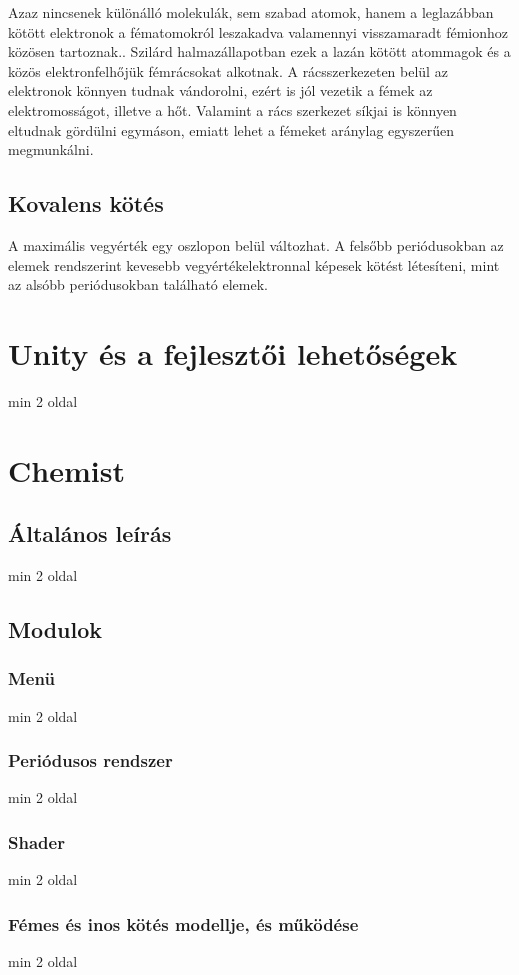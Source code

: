 \documentclass[colorlinks]{thesis-ekf}
\theoremstyle{definition}
\theoremstyle{remark}
\begin{document}
Azaz nincsenek különálló molekulák, sem szabad atomok, hanem a leglazábban kötött elektronok a fématomokról leszakadva valamennyi visszamaradt fémionhoz közösen tartoznak.\cite{eke_kemia_ppt}. Szilárd halmazállapotban ezek a lazán kötött atommagok és a közös elektronfelhőjük fémrácsokat alkotnak. A rácsszerkezeten belül az elektronok könnyen tudnak vándorolni, ezért is jól vezetik a fémek az elektromosságot, illetve a hőt.\cite{wiki_femes} Valamint a rács szerkezet síkjai is könnyen eltudnak gördülni egymáson, emiatt lehet a fémeket aránylag egyszerűen megmunkálni.

\section{Kovalens kötés}
 A maximális vegyérték egy oszlopon belül változhat. A felsőbb periódusokban az elemek rendszerint kevesebb vegyértékelektronnal képesek kötést létesíteni, mint az alsóbb periódusokban található elemek.\cite{periodusos_ppt}
\chapter{Unity és a fejlesztői lehetőségek}
min 2 oldal
\chapter{Chemist}
\section{Általános leírás}
min 2 oldal
\section{Modulok}
\subsection{Menü}
min 2 oldal
\subsection{Periódusos rendszer}
min 2 oldal
\subsection{Shader}
min 2 oldal
\subsection{Fémes és inos kötés modellje, és működése}
min 2 oldal
\end{document}
